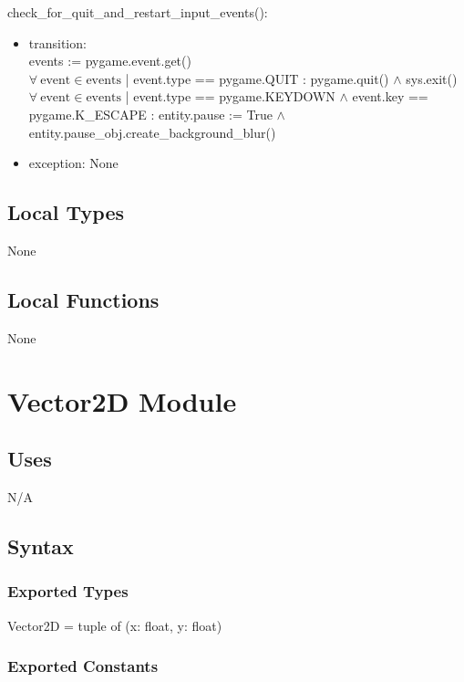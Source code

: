 \documentclass[12pt]{article}
\begin{document}
check\_for\_quit\_and\_restart\_input\_events():
\begin{itemize}
    \item transition: \\ events := pygame.event.get()\\
    $\forall\ \text{event} \in \text{events}$ | event.type == pygame.QUIT : pygame.quit() $\land$ sys.exit()\\
    
    $\forall\ \text{event} \in \text{events}$ | event.type == pygame.KEYDOWN $\land$ event.key == pygame.K\_ESCAPE : entity.pause := True $\land$ entity.pause\_obj.create\_background\_blur()
    \item exception: None
\end{itemize}


\subsection* {Local Types}

None

\subsection* {Local Functions}

None

\newpage

\section* {Vector2D Module}

\subsection* {Uses}

N/A

\subsection* {Syntax}

\subsubsection* {Exported Types}

Vector2D = tuple of (x: float, y: float)

\subsubsection* {Exported Constants}
\end{document}
